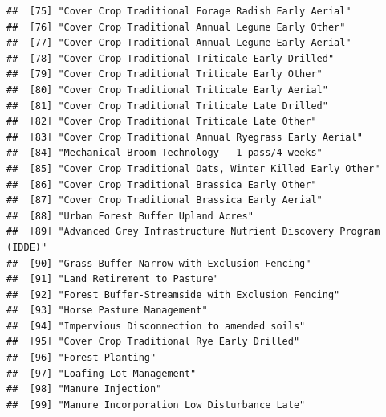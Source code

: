 \documentclass[
]{article}
\begin{document}
\begin{verbatim}
##  [75] "Cover Crop Traditional Forage Radish Early Aerial"                                              
##  [76] "Cover Crop Traditional Annual Legume Early Other"                                               
##  [77] "Cover Crop Traditional Annual Legume Early Aerial"                                              
##  [78] "Cover Crop Traditional Triticale Early Drilled"                                                 
##  [79] "Cover Crop Traditional Triticale Early Other"                                                   
##  [80] "Cover Crop Traditional Triticale Early Aerial"                                                  
##  [81] "Cover Crop Traditional Triticale Late Drilled"                                                  
##  [82] "Cover Crop Traditional Triticale Late Other"                                                    
##  [83] "Cover Crop Traditional Annual Ryegrass Early Aerial"                                            
##  [84] "Mechanical Broom Technology - 1 pass/4 weeks"                                                   
##  [85] "Cover Crop Traditional Oats, Winter Killed Early Other"                                         
##  [86] "Cover Crop Traditional Brassica Early Other"                                                    
##  [87] "Cover Crop Traditional Brassica Early Aerial"                                                   
##  [88] "Urban Forest Buffer Upland Acres"                                                               
##  [89] "Advanced Grey Infrastructure Nutrient Discovery Program (IDDE)"                                 
##  [90] "Grass Buffer-Narrow with Exclusion Fencing"                                                     
##  [91] "Land Retirement to Pasture"                                                                     
##  [92] "Forest Buffer-Streamside with Exclusion Fencing"                                                
##  [93] "Horse Pasture Management"                                                                       
##  [94] "Impervious Disconnection to amended soils"                                                      
##  [95] "Cover Crop Traditional Rye Early Drilled"                                                       
##  [96] "Forest Planting"                                                                                
##  [97] "Loafing Lot Management"                                                                         
##  [98] "Manure Injection"                                                                               
##  [99] "Manure Incorporation Low Disturbance Late"                                                      

\end{verbatim}
\end{document}
